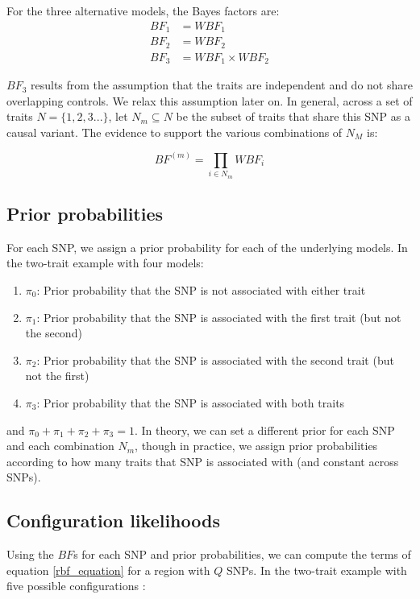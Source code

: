 \documentclass{article}
\begin{document}
\noindent For the three alternative models, the Bayes factors are:
\begin{align}
BF_1 & = WBF_1 \\
BF_2 & = WBF_2 \\
BF_3 & = WBF_1 \times WBF_2
\end{align}

\noindent $BF_3$ results from the assumption that the traits are independent and do not share overlapping controls. We relax this assumption later on. In general, across a set of traits $N = \big\{1,2,3...\big\}$, let $N_m \subseteq N$ be the subset of traits that share this SNP as a causal variant. The evidence to support the various combinations of $N_M$ is:

\begin{equation}
BF^{(m)} = \prod_{i \in N_m} WBF_i
\end{equation}


\subsection{Prior probabilities}
For each SNP, we assign a prior probability for each of the underlying models. In the two-trait example with four models:
\begin{enumerate}[start=0]
  \item $\pi_0$: Prior probability that the SNP is not associated with either trait
  \item $\pi_1$: Prior probability that the SNP is associated with the first trait (but not the second)
  \item $\pi_2$: Prior probability that the SNP is associated with the second trait (but not the first)
  \item $\pi_3$: Prior probability that the SNP is associated with both traits
\end{enumerate}

\noindent and $\pi_0 + \pi_1 + \pi_2 + \pi_3 = 1$. In theory, we can set a different prior for each SNP and each combination $N_m$, though in practice, we assign prior probabilities according to how many traits that SNP is associated with (and constant across SNPs). 

\subsection{Configuration likelihoods}
Using the $BF$s for each SNP and prior probabilities, we can compute the terms of equation \ref{rbf_equation} for a region with $Q$ SNPs. In the two-trait example with five possible configurations \citep{Giambartolomei:2014aa}:
\end{document}
